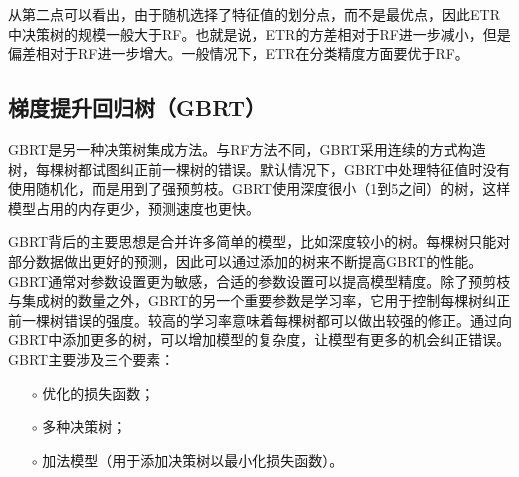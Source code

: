从第二点可以看出，由于随机选择了特征值的划分点，而不是最优点，因此ETR中决策树的规模一般大于RF。也就是说，ETR的方差相对于RF进一步减小，但是偏差相对于RF进一步增大。一般情况下，ETR在分类精度方面要优于RF。

\subsection{梯度提升回归树（GBRT）}\label{sec:ml_gbr}

GBRT是另一种决策树集成方法。与RF方法不同，GBRT采用连续的方式构造树，每棵树都试图纠正前一棵树的错误。默认情况下，GBRT中处理特征值时没有使用随机化，而是用到了强预剪枝。GBRT使用深度很小（1到5之间）的树，这样模型占用的内存更少，预测速度也更快。

GBRT背后的主要思想是合并许多简单的模型，比如深度较小的树。每棵树只能对部分数据做出更好的预测，因此可以通过添加的树来不断提高GBRT的性能。GBRT通常对参数设置更为敏感，合适的参数设置可以提高模型精度。除了预剪枝与集成树的数量之外，GBRT的另一个重要参数是学习率，它用于控制每棵树纠正前一棵树错误的强度。较高的学习率意味着每棵树都可以做出较强的修正。通过向GBRT中添加更多的树，可以增加模型的复杂度，让模型有更多的机会纠正错误。GBRT主要涉及三个要素：
\begin{itemize}
  \item[$\circ$] 优化的损失函数；
  \item[$\circ$] 多种决策树；
  \item[$\circ$] 加法模型（用于添加决策树以最小化损失函数）。
\end{itemize}



